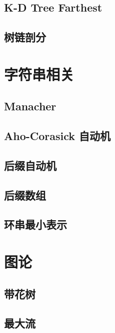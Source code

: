 \documentclass[10pt, a4paper]{article}
\begin{document}
  \subsection{K-D Tree Farthest}
    

  \subsection{树链剖分}
    

\section{字符串相关}
  \subsection{Manacher}
    

    \subsection{Aho-Corasick 自动机}
    

  \subsection{后缀自动机}
    

  \subsection{后缀数组}
    
  
  \subsection{环串最小表示}
    

\section{图论}
  \subsection{带花树}
    

  \subsection{最大流}
    
  
\end{document}
